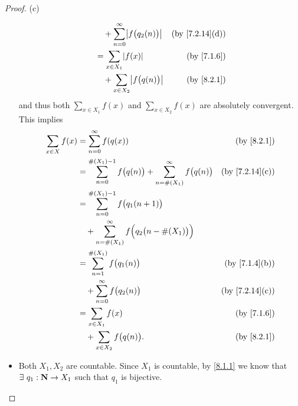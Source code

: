 \begin{proof}{(c)}
\begin{itemize}
\begin{align*}
                                      & \quad + \sum_{n = 0}^\infty \abs{f\big(q_2(n)\big)}                                                  & \text{(by \cref{7.2.14}(d))} \\
                                      & = \sum_{x \in X_1} \abs{f(x)}                                                                        & \text{(by \cref{7.1.6})}     \\
                                      & \quad + \sum_{x \in X_2} \abs{f\big(q(n)\big)}                                                       & \text{(by \cref{8.2.1})}
          \end{align*}
          and thus both \(\sum_{x \in X_1} f(x)\) and \(\sum_{x \in X_2} f(x)\) are absolutely convergent.
          This implies
          \begin{align*}
            \sum_{x \in X} f(x) & = \sum_{n = 0}^\infty f(q(x))                                                            & \text{(by \cref{8.2.1})}     \\
                                & = \sum_{n = 0}^{\#(X_1) - 1} f\big(q(n)\big) + \sum_{n = \#(X_1)}^\infty f\big(q(n)\big) & \text{(by \cref{7.2.14}(c))} \\
                                & = \sum_{n = 0}^{\#(X_1) - 1} f\big(q_1(n + 1)\big)                                                                      \\
                                & \quad + \sum_{n = \#(X_1)}^\infty f\Big(q_2\big(n - \#(X_1)\big)\Big)                                                   \\
                                & = \sum_{n = 1}^{\#(X_1)} f\big(q_1(n)\big)                                               & \text{(by \cref{7.1.4}(b))}  \\
                                & \quad + \sum_{n = 0}^\infty f\big(q_2(n)\big)                                            & \text{(by \cref{7.2.14}(c))} \\
                                & = \sum_{x \in X_1} f(x)                                                                  & \text{(by \cref{7.1.6})}     \\
                                & \quad + \sum_{x \in X_2} f\big(q(n)\big).                                                & \text{(by \cref{8.2.1})}
          \end{align*}
    \item Both \(X_1, X_2\) are countable.
          Since \(X_1\) is countable, by \cref{8.1.1} we know that \(\exists\ q_1 : \mathbf{N} \to X_1\) such that \(q_1\) is bijective.

\end{itemize}
\end{proof}
